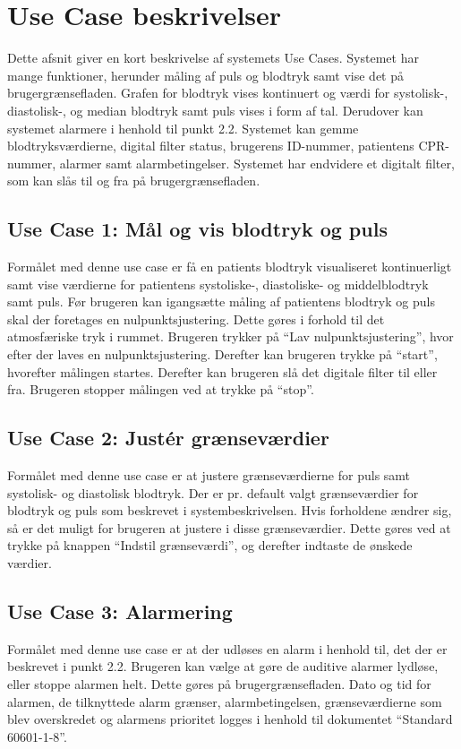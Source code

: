 \section{Use Case beskrivelser}
Dette afsnit giver en kort beskrivelse af systemets Use Cases. Systemet har mange funktioner, herunder måling af puls og blodtryk samt vise det på brugergrænsefladen. Grafen for blodtryk vises kontinuert og værdi for systolisk-, diastolisk-, og median blodtryk samt puls vises i form af tal. Derudover kan systemet alarmere i henhold til punkt 2.2. Systemet kan gemme blodtryksværdierne, digital filter status, brugerens ID-nummer, patientens CPR-nummer, alarmer samt alarmbetingelser. Systemet har endvidere et digitalt filter, som kan slås til og fra på brugergrænsefladen. 
\subsection{Use Case 1: Mål og vis blodtryk og puls}
Formålet med denne use case er få en patients blodtryk visualiseret kontinuerligt samt vise værdierne for patientens systoliske-, diastoliske- og middelblodtryk samt puls. Før brugeren kan igangsætte måling af patientens blodtryk og puls skal der foretages en nulpunktsjustering. Dette gøres i forhold til det atmosfæriske tryk i rummet. Brugeren trykker på “Lav nulpunktsjustering”, hvor efter der laves en nulpunktsjustering. Derefter kan brugeren trykke på “start”, hvorefter målingen startes. Derefter kan brugeren slå det digitale filter til eller fra. Brugeren stopper målingen ved at trykke på “stop”.


\subsection{Use Case 2: Justér grænseværdier}
Formålet med denne use case er at justere grænseværdierne for puls samt systolisk- og diastolisk blodtryk. Der er pr. default valgt grænseværdier for blodtryk og puls som beskrevet i systembeskrivelsen. Hvis forholdene ændrer sig, så er det muligt for brugeren at justere i disse grænseværdier. Dette gøres ved at trykke på knappen “Indstil grænseværdi”, og derefter indtaste de ønskede værdier. 

\subsection{Use Case 3: Alarmering}
Formålet med denne use case er at der udløses en alarm i henhold til, det der er beskrevet i punkt 2.2. Brugeren kan vælge at gøre de auditive alarmer lydløse, eller stoppe alarmen helt. Dette gøres på brugergrænsefladen.
Dato og tid for alarmen, de tilknyttede alarm grænser, alarmbetingelsen, grænseværdierne som blev overskredet og alarmens prioritet logges i henhold til dokumentet “Standard 60601-1-8”.

